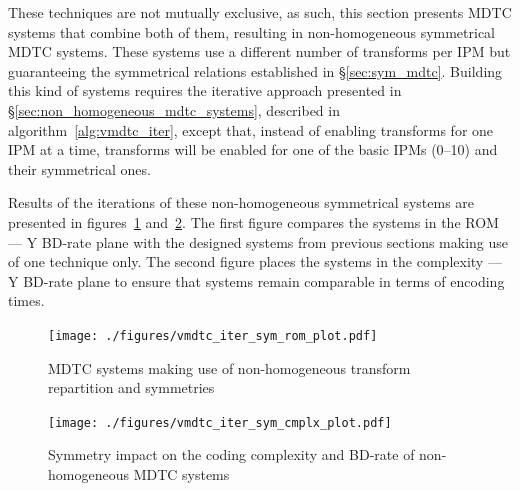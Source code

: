 \documentclass[11pt,a4paper,openright,twoside]{book}
\def\usepdfs{1} %
\numberwithin{equation}{section} %
\numberwithin{figure}{section} %
\numberwithin{table}{section} %
\begin{document}
These techniques are not mutually exclusive, as such, this section presents
\ac{MDTC} systems that combine both of them, resulting in non-homogeneous
symmetrical \ac{MDTC} systems.
These systems use a different number of transforms per \ac{IPM} but
guaranteeing the symmetrical relations established in \S\ref{sec:sym_mdtc}.
Building this kind of systems requires the iterative approach presented in
\S\ref{sec:non_homogeneous_mdtc_systems}, described in
algorithm~\ref{alg:vmdtc_iter}, except that, instead of enabling transforms
for one \ac{IPM} at a time, transforms will be enabled for one of the basic
\acp{IPM} (0--10) and their symmetrical ones.

Results of the iterations of these non-homogeneous symmetrical systems are
presented in figures~\ref{fig:vmdtc_iter_sym_rom}
and~\ref{fig:vmdtc_iter_sym_complx}.
The first figure compares the systems in the \acs{ROM} --- Y \acs{BD}-rate
plane with the designed systems from previous sections making use of one
technique only.
The second figure places the systems in the complexity --- Y \acs{BD}-rate
plane to ensure that systems remain comparable in terms of encoding times.

\begin{figure}[tb]
	\centering
	\ifthenelse{\usepdfs = 0}
	{}
	{\texttt{[image: ./figures/vmdtc\_iter\_sym\_rom\_plot.pdf]}}
	\caption{\acs{MDTC} systems making use of non-homogeneous transform
	repartition and symmetries}
	\label{fig:vmdtc_iter_sym_rom}
\end{figure}

\begin{figure}[tb]
	\centering
	\ifthenelse{\usepdfs = 0}
	{}
	{\texttt{[image: ./figures/vmdtc\_iter\_sym\_cmplx\_plot.pdf]}}
	\caption{Symmetry impact on the coding complexity and \acs{BD}-rate of
	non-homogeneous \acs{MDTC} systems}
	\label{fig:vmdtc_iter_sym_complx}
\end{figure}
\end{document}
